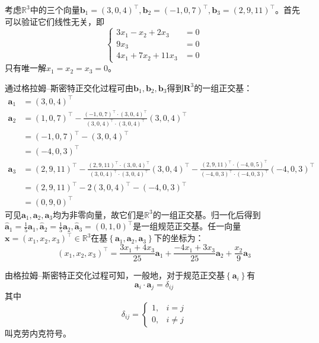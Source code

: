 \documentclass[main.tex]{subfiles}
\begin{document}
\begin{example}
考虑$\mathbb{R}^3$中的三个向量$\mathbf{b}_1=\left(3,0,4\right)^\intercal,\mathbf{b}_2=\left(-1,0,7\right)^\intercal,\mathbf{b}_3=\left(2,9,11\right)^\intercal$。首先可以验证它们线性无关，即
\[
\left\{\begin{array}{rl}
3x_1-x_2+2x_3&=0\\ 
9x_3&=0\\ 
4x_1+7x_2+11x_3&=0
\end{array}\right.
\]
只有唯一解$x_1=x_2=x_3=0$。

通过格拉姆--斯密特正交化过程可由$\mathbf{b}_1,\mathbf{b}_2,\mathbf{b}_3$得到$\mathbf{R}^3$的一组正交基：
\begin{align*}
    \mathbf{a}_1&=\left(3,0,4\right)^\intercal\\
    \mathbf{a}_2&=\left(1,0,7\right)^\intercal-\frac{\left(-1,0,7\right)^\intercal\cdot\left(3,0,4\right)^\intercal}{\left(3,0,4\right)^\intercal\cdot\left(3,0,4\right)^\intercal}\left(3,0,4\right)^\intercal\\
    &=\left(-1,0,7\right)^\intercal-\left(3,0,4\right)^\intercal\\
    &=\left(-4,0,3\right)^\intercal\\
    \mathbf{a}_3&=\left(2,9,11\right)^\intercal-\frac{\left(2,9,11\right)^\intercal\cdot\left(3,0,4\right)^\intercal}{\left(3,0,4\right)^\intercal\cdot\left(3,0,4\right)^\intercal}\left(3,0,4\right)^\intercal-\frac{\left(2,9,11\right)^\intercal\cdot\left(-4,0,5\right)^\intercal}{\left(-4,0,3\right)^\intercal\cdot\left(-4,0,3\right)^\intercal}\left(-4,0,3\right)^\intercal\\
    &=\left(2,9,11\right)^\intercal-2\left(3,0,4\right)^\intercal-\left(-4,0,3\right)^\intercal\\
    &=\left(0,9,0\right)^\intercal
\end{align*}
可见$\mathbf{a}_1,\mathbf{a}_2,\mathbf{a}_3$均为非零向量，故它们是$\mathbb{R}^3$的一组正交基。归一化后得到$\mathbf{\hat{a}}_1=\frac{1}{5}\mathbf{a}_1,\mathbf{\hat{a}}_2=\frac{1}{5}\mathbf{a}_2,\mathbf{\hat{a}}_3=\left(0,1,0\right)^\intercal$是一组规范正交基。任一向量$\mathbf{x}=\left(x_1,x_2,x_3\right)^\intercal\in\mathbb{R}^3$在基$\left\{\mathbf{a}_1,\mathbf{a}_2,\mathbf{a}_3\right\}$下的坐标为：
\[\left(x_1,x_2,x_3\right)^\intercal=\frac{3x_1+4x_3}{25}\mathbf{a}_1+\frac{-4x_1+3x_3}{25}\mathbf{a}_2+\frac{x_2}{9}\mathbf{a}_3\]

由格拉姆--斯密特正交化过程可知，一般地，对于规范正交基$\left\{\mathbf{a}_i\right\}$有
\[\mathbf{a}_i\cdot\mathbf{a}_j=\delta_{ij}\]
其中
\[\delta_{ij}=\left\{\begin{array}{ll}
1,&i=j\\
0,&i\neq j
\end{array}\right.
\]
叫克劳内克符号。


\end{example}
\end{document}
